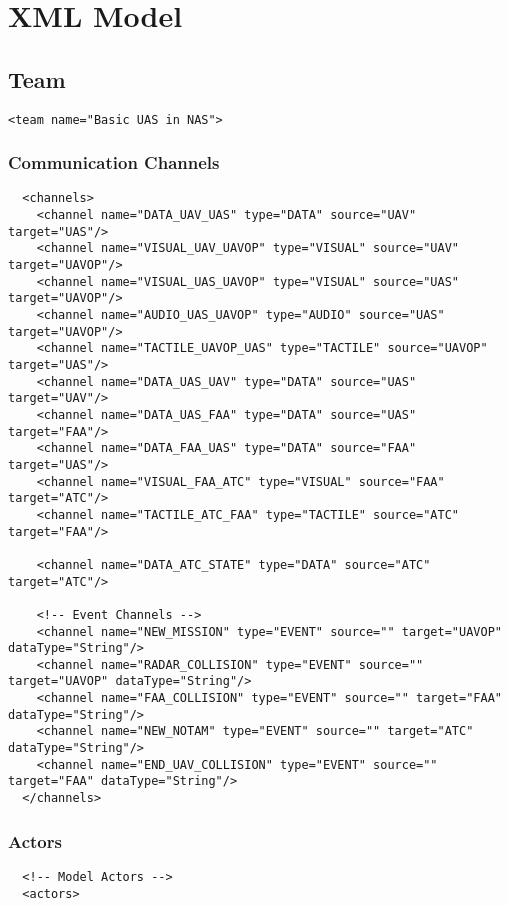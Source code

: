 \chapter{XML Model} \label{XMLModel}
\section{Team}
\begin{verbatim}
<team name="Basic UAS in NAS">
\end{verbatim}
\subsection{Communication Channels}
\begin{verbatim}
  <channels>
    <channel name="DATA_UAV_UAS" type="DATA" source="UAV" target="UAS"/>
    <channel name="VISUAL_UAV_UAVOP" type="VISUAL" source="UAV" target="UAVOP"/>
    <channel name="VISUAL_UAS_UAVOP" type="VISUAL" source="UAS" target="UAVOP"/>
    <channel name="AUDIO_UAS_UAVOP" type="AUDIO" source="UAS" target="UAVOP"/>
    <channel name="TACTILE_UAVOP_UAS" type="TACTILE" source="UAVOP" target="UAS"/>
    <channel name="DATA_UAS_UAV" type="DATA" source="UAS" target="UAV"/>
    <channel name="DATA_UAS_FAA" type="DATA" source="UAS" target="FAA"/>
    <channel name="DATA_FAA_UAS" type="DATA" source="FAA" target="UAS"/>
    <channel name="VISUAL_FAA_ATC" type="VISUAL" source="FAA" target="ATC"/>
    <channel name="TACTILE_ATC_FAA" type="TACTILE" source="ATC" target="FAA"/>
    
    <channel name="DATA_ATC_STATE" type="DATA" source="ATC" target="ATC"/>   
  
    <!-- Event Channels -->
    <channel name="NEW_MISSION" type="EVENT" source="" target="UAVOP" dataType="String"/>
    <channel name="RADAR_COLLISION" type="EVENT" source="" target="UAVOP" dataType="String"/>   
    <channel name="FAA_COLLISION" type="EVENT" source="" target="FAA" dataType="String"/>
    <channel name="NEW_NOTAM" type="EVENT" source="" target="ATC" dataType="String"/>   
    <channel name="END_UAV_COLLISION" type="EVENT" source="" target="FAA" dataType="String"/>
  </channels>
\end{verbatim}

\subsection{Actors}
\begin{verbatim}
  <!-- Model Actors -->
  <actors>
\end{verbatim}
